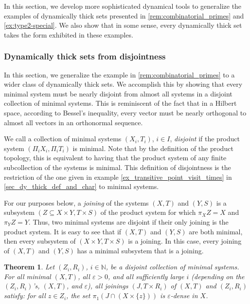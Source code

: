 \documentclass[letter,11pt]{article}
\theoremstyle{plain}
\newtheorem{theorem}{Theorem}
\theoremstyle{definition}
\theoremstyle{plain}
\theoremstyle{plain}
\numberwithin{equation}{section}
\newcommand{\eps}{\epsilon}
\newcommand{\N}{\mathbb{N}}
\renewcommand{\epsilon}{\varepsilon}
\begin{document}
In this section, we develop more sophisticated dynamical tools to generalize the examples of dynamically thick sets presented in \cref{rem:combinatorial_primes} and \cref{ex:type2-special}.  We also show that in some sense, every dynamically thick set takes the form exhibited in these examples.

\subsubsection{Dynamically thick sets from disjointness}
\label{sec_dy_thick_from_disjointness}

In this section, we generalize the example in \cref{rem:combinatorial_primes} to a wider class of dynamically thick sets.  We accomplish this by showing that every minimal system must be nearly disjoint from almost all systems in a disjoint collection of minimal systems.  This is reminiscent of the fact that in a Hilbert space, according to Bessel's inequality, every vector must be nearly orthogonal to almost all vectors in an orthonormal sequence.

We call a collection of minimal systems $(X_i, T_i)$, $i \in I$, \emph{disjoint} if the product system $(\Pi_i X_i, \Pi_i T_i)$ is minimal.  Note that by the definition of the product topology, this is equivalent to having that the product system of any finite subcollection of the systems is minimal. This definition of disjointness is the restriction of the one given in example \eqref{ex_transitive_point_visit_times} in \cref{sec_dy_thick_def_and_char} to minimal systems.

For our purposes below, a \emph{joining} of the systems $(X,T)$ and $(Y,S)$ is a subsystem $(Z \subseteq X \times Y, T \times S)$ of the product system for which $\pi_X Z = X$ and $\pi_Y Z = Y$. Thus, two minimal systems are disjoint if their only joining is the product system.  It is easy to see that if $(X,T)$ and $(Y,S)$ are both minimal, then every subsystem of $(X \times Y, T \times S)$ is a joining.  In this case, every joining of $(X,T)$ and $(Y,S)$ has a minimal subsystem that is a joining.

\begin{theorem}
\label{thm_bessel}
    Let $(Z_i,R_i)$, $i \in \N$, be a disjoint collection of minimal systems.  For all minimal $(X,T)$, all $\eps > 0$, and all sufficiently large $i$ (depending on the $(Z_i,R_i)$'s, $(X,T)$, and $\eps$), all joinings $(J,T \times R_i)$ of $(X,T)$ and $(Z_i,R_i)$ satisfy: for all $z \in Z_i$, the set $\pi_1(J \cap (X \times \{z\}))$ is $\eps$-dense in $X$.
\end{theorem}
\end{document}
